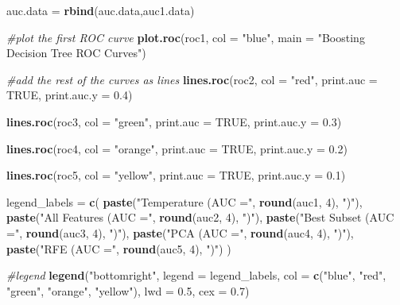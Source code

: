 \documentclass[
]{article}
\newenvironment{Shaded}{\begin{snugshade}}{\end{snugshade}}
\newcommand{\AttributeTok}[1]{\textcolor[rgb]{0.13,0.29,0.53}{#1}}
\newcommand{\CommentTok}[1]{\textcolor[rgb]{0.56,0.35,0.01}{\textit{#1}}}
\newcommand{\ConstantTok}[1]{\textcolor[rgb]{0.56,0.35,0.01}{#1}}
\newcommand{\DecValTok}[1]{\textcolor[rgb]{0.00,0.00,0.81}{#1}}
\newcommand{\FloatTok}[1]{\textcolor[rgb]{0.00,0.00,0.81}{#1}}
\newcommand{\FunctionTok}[1]{\textcolor[rgb]{0.13,0.29,0.53}{\textbf{#1}}}
\newcommand{\NormalTok}[1]{#1}
\newcommand{\OtherTok}[1]{\textcolor[rgb]{0.56,0.35,0.01}{#1}}
\newcommand{\StringTok}[1]{\textcolor[rgb]{0.31,0.60,0.02}{#1}}
\begin{document}
\begin{Shaded}
\begin{Highlighting}[]
\NormalTok{auc.data }\OtherTok{=} \FunctionTok{rbind}\NormalTok{(auc.data,auc1.data)}

\CommentTok{\#plot the first ROC curve}
\FunctionTok{plot.roc}\NormalTok{(roc1, }\AttributeTok{col =} \StringTok{"blue"}\NormalTok{, }\AttributeTok{main =} \StringTok{"Boosting Decision Tree ROC Curves"}\NormalTok{)}

\CommentTok{\#add the rest of the curves as lines}
\FunctionTok{lines.roc}\NormalTok{(roc2, }\AttributeTok{col =} \StringTok{"red"}\NormalTok{, }\AttributeTok{print.auc =} \ConstantTok{TRUE}\NormalTok{, }\AttributeTok{print.auc.y =} \FloatTok{0.4}\NormalTok{)}

\FunctionTok{lines.roc}\NormalTok{(roc3, }\AttributeTok{col =} \StringTok{"green"}\NormalTok{, }\AttributeTok{print.auc =} \ConstantTok{TRUE}\NormalTok{, }\AttributeTok{print.auc.y =} \FloatTok{0.3}\NormalTok{)}

\FunctionTok{lines.roc}\NormalTok{(roc4, }\AttributeTok{col =} \StringTok{"orange"}\NormalTok{, }\AttributeTok{print.auc =} \ConstantTok{TRUE}\NormalTok{, }\AttributeTok{print.auc.y =} \FloatTok{0.2}\NormalTok{)}

\FunctionTok{lines.roc}\NormalTok{(roc5, }\AttributeTok{col =} \StringTok{"yellow"}\NormalTok{, }\AttributeTok{print.auc =} \ConstantTok{TRUE}\NormalTok{, }\AttributeTok{print.auc.y =} \FloatTok{0.1}\NormalTok{)}

\NormalTok{legend\_labels }\OtherTok{=} \FunctionTok{c}\NormalTok{(}
  \FunctionTok{paste}\NormalTok{(}\StringTok{"Temperature (AUC ="}\NormalTok{, }\FunctionTok{round}\NormalTok{(auc1, }\DecValTok{4}\NormalTok{), }\StringTok{")"}\NormalTok{),}
  \FunctionTok{paste}\NormalTok{(}\StringTok{"All Features (AUC ="}\NormalTok{, }\FunctionTok{round}\NormalTok{(auc2, }\DecValTok{4}\NormalTok{), }\StringTok{")"}\NormalTok{),}
  \FunctionTok{paste}\NormalTok{(}\StringTok{"Best Subset (AUC ="}\NormalTok{, }\FunctionTok{round}\NormalTok{(auc3, }\DecValTok{4}\NormalTok{), }\StringTok{")"}\NormalTok{),}
  \FunctionTok{paste}\NormalTok{(}\StringTok{"PCA (AUC ="}\NormalTok{, }\FunctionTok{round}\NormalTok{(auc4, }\DecValTok{4}\NormalTok{), }\StringTok{")"}\NormalTok{),}
  \FunctionTok{paste}\NormalTok{(}\StringTok{"RFE (AUC ="}\NormalTok{, }\FunctionTok{round}\NormalTok{(auc5, }\DecValTok{4}\NormalTok{), }\StringTok{")"}\NormalTok{)}
\NormalTok{)}

\CommentTok{\#legend}
\FunctionTok{legend}\NormalTok{(}\StringTok{"bottomright"}\NormalTok{, }\AttributeTok{legend =}\NormalTok{ legend\_labels, }\AttributeTok{col =} \FunctionTok{c}\NormalTok{(}\StringTok{"blue"}\NormalTok{, }\StringTok{"red"}\NormalTok{, }\StringTok{"green"}\NormalTok{, }\StringTok{"orange"}\NormalTok{, }\StringTok{"yellow"}\NormalTok{), }\AttributeTok{lwd =} \FloatTok{0.5}\NormalTok{, }\AttributeTok{cex =} \FloatTok{0.7}\NormalTok{)}
\end{Highlighting}
\end{Shaded}
\end{document}
